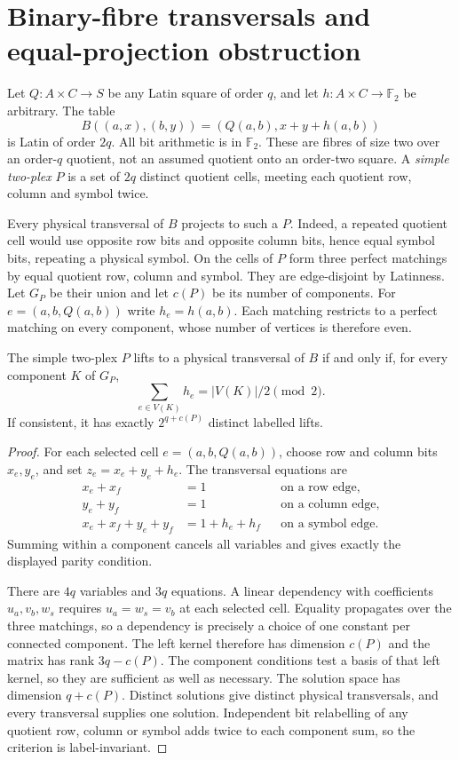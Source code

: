 \section{Binary-fibre transversals and equal-projection obstruction}
\label{sec:binary-transversals}

Let $Q:A\times C\to S$ be any Latin square of order $q$, and let
$h:A\times C\to\mathbb F_2$ be arbitrary. The table
\[
 B((a,x),(b,y))=(Q(a,b),x+y+h(a,b))
\]
is Latin of order $2q$. All bit arithmetic is in $\mathbb F_2$.
These are fibres of size two over an order-$q$
quotient, not an assumed quotient onto an order-two square.
A \emph{simple two-plex} $P$ is a set of $2q$ distinct quotient
cells, meeting each quotient row, column and symbol twice.

Every physical transversal of $B$ projects to such a $P$.
Indeed, a repeated quotient cell would use opposite row bits and
opposite column bits, hence equal symbol bits, repeating a physical
symbol. On the cells of $P$ form three perfect matchings by equal
quotient row, column and symbol. They are edge-disjoint by Latinness.
Let $G_P$ be their union and let $c(P)$ be its number of components.
For $e=(a,b,Q(a,b))$ write $h_e=h(a,b)$.
Each matching restricts to a perfect matching on every component,
whose number of vertices is therefore even.

\begin{theorem}
\label{thm:binary-lift-count}
The simple two-plex $P$ lifts to a physical transversal of $B$ if and
only if, for every component $K$ of $G_P$,
\[
 \sum_{e\in V(K)}h_e=|V(K)|/2\pmod2.
\]
If consistent, it has exactly $2^{q+c(P)}$ distinct labelled lifts.
\end{theorem}
\begin{proof}
For each selected cell $e=(a,b,Q(a,b))$, choose row and column bits
$x_e,y_e$, and set $z_e=x_e+y_e+h_e$. The transversal equations are
\[
\begin{aligned}
 x_e+x_f&=1 &&\text{on a row edge},\\
 y_e+y_f&=1 &&\text{on a column edge},\\
 x_e+x_f+y_e+y_f&=1+h_e+h_f &&\text{on a symbol edge}.
\end{aligned}
\]
Summing within a component cancels all variables and gives exactly
the displayed parity condition.

There are $4q$ variables and $3q$ equations. A linear dependency with
coefficients $u_a,v_b,w_s$ requires $u_a=w_s=v_b$ at each selected
cell. Equality propagates over the three matchings, so a dependency
is precisely a choice of one constant per connected component.
The left kernel therefore has dimension $c(P)$ and the matrix has
rank $3q-c(P)$. The component conditions test a basis of that left
kernel, so they are sufficient as well as necessary. The solution
space has dimension $q+c(P)$. Distinct solutions give distinct
physical transversals, and every transversal supplies one solution.
Independent bit relabelling of any quotient row, column or symbol
adds twice to each component sum, so the criterion is label-invariant.
\end{proof}

